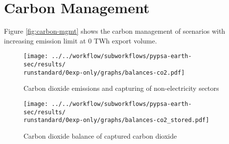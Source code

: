 \section{Carbon Management}
\label{subsec:carbon_mgmt}

Figure \ref{fig:carbon-mgmt} shows the carbon management of scenarios with increasing emission limit at 0 TWh export volume.


\begin{figure*}[h!] %
    \centering
    \begin{subfigure}[b]{0.49\linewidth}
        \centering
        \texttt{[image: ../../workflow/subworkflows/pypsa-earth-sec/results/\\runstandard/0exp-only/graphs/balances-co2.pdf]}
        \caption{Carbon dioxide emissions and capturing of non-electricity sectors}
        \label{fig:carbon-atmo}
    \end{subfigure}
    \hfill
    \begin{subfigure}[b]{0.49\linewidth}
        \centering
        \texttt{[image: ../../workflow/subworkflows/pypsa-earth-sec/results/\\runstandard/0exp-only/graphs/balances-co2\_stored.pdf]}
        \caption{Carbon dioxide balance of captured carbon dioxide}
        \label{fig:carbon-store}
    \end{subfigure}
    \hfill
    \caption{Carbon dioxide \ref{fig:carbon-atmo} emissions and capturing as well as \ref{fig:carbon-store} management of captured carbon dioxide}
    \label{fig:carbon-mgmt}
\end{figure*}


\clearpage